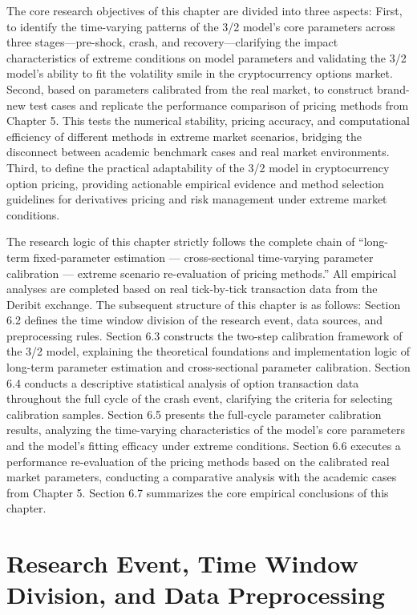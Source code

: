 The core research objectives of this chapter are divided into three aspects: First, to identify the time-varying patterns of the 3/2 model's core parameters across three stages—pre-shock, crash, and recovery—clarifying the impact characteristics of extreme conditions on model parameters and validating the 3/2 model's ability to fit the volatility smile in the cryptocurrency options market. Second, based on parameters calibrated from the real market, to construct brand-new test cases and replicate the performance comparison of pricing methods from Chapter 5. This tests the numerical stability, pricing accuracy, and computational efficiency of different methods in extreme market scenarios, bridging the disconnect between academic benchmark cases and real market environments. Third, to define the practical adaptability of the 3/2 model in cryptocurrency option pricing, providing actionable empirical evidence and method selection guidelines for derivatives pricing and risk management under extreme market conditions.

The research logic of this chapter strictly follows the complete chain of ``long-term fixed-parameter estimation — cross-sectional time-varying parameter calibration — extreme scenario re-evaluation of pricing methods.'' All empirical analyses are completed based on real tick-by-tick transaction data from the Deribit exchange. The subsequent structure of this chapter is as follows: Section 6.2 defines the time window division of the research event, data sources, and preprocessing rules. Section 6.3 constructs the two-step calibration framework of the 3/2 model, explaining the theoretical foundations and implementation logic of long-term parameter estimation and cross-sectional parameter calibration. Section 6.4 conducts a descriptive statistical analysis of option transaction data throughout the full cycle of the crash event, clarifying the criteria for selecting calibration samples. Section 6.5 presents the full-cycle parameter calibration results, analyzing the time-varying characteristics of the model's core parameters and the model's fitting efficacy under extreme conditions. Section 6.6 executes a performance re-evaluation of the pricing methods based on the calibrated real market parameters, conducting a comparative analysis with the academic cases from Chapter 5. Section 6.7 summarizes the core empirical conclusions of this chapter.

\section{Research Event, Time Window Division, and Data Preprocessing}

